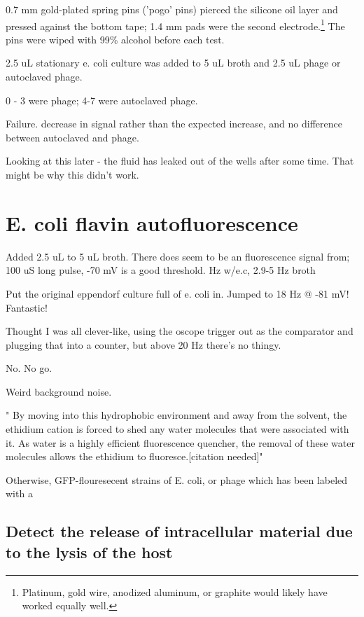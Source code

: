 \documentclass[paper.tex]{subfiles}
\begin{document}
0.7 mm gold-plated spring pins ('pogo' pins) pierced the silicone oil layer and pressed against the bottom tape; 1.4 mm pads were the second electrode.\footnote{Platinum, gold wire, anodized aluminum, or graphite would likely have worked equally well.} The pins were wiped with 99\% alcohol before each test.

2.5 uL stationary e. coli culture was added to 5 uL broth and 2.5 uL phage or autoclaved phage.

0 - 3 were phage; 4-7 were autoclaved phage.

Failure. decrease in signal rather than the expected increase, and no difference between autoclaved and phage.

Looking at this later - the fluid has leaked out of the wells after some time. That might be why this didn't work.



\section{E. coli flavin autofluorescence}



Added 2.5 uL to 5 uL broth. There does seem to be an fluorescence signal from; 100 uS long pulse, -70 mV is a good threshold.
Hz w/e.c, 2.9-5 Hz broth

Put the original eppendorf culture full of e. coli in. Jumped to 18 Hz @ -81 mV! Fantastic!

Thought I was all clever-like, using the oscope trigger out as the comparator and plugging that into a counter,
but above 20 Hz there's no thingy.

No. No go.

Weird background noise.

" By moving into this hydrophobic environment and away from the solvent, the ethidium cation is forced to shed any water molecules that were associated with it. As water is a highly efficient fluorescence quencher, the removal of these water molecules allows the ethidium to fluoresce.[citation needed]"




Otherwise, GFP-flouresecent strains of E. coli, or phage which has been labeled with a 




\subsection{Detect the release of intracellular material due to the lysis of the host}
\end{document}
